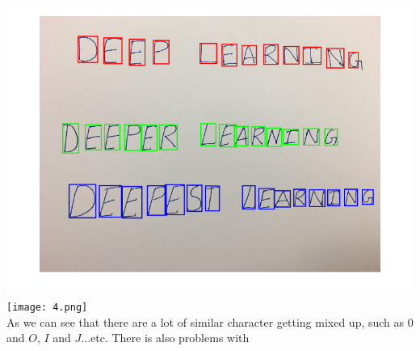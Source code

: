 \documentclass[12pt,letterpaper,boxed]{hmcpset}
\begin{document}
\begin{solution}
\includegraphics[width=\textwidth]{4_3_1.png}\\
\texttt{[image: 4.png]}\\
As we can see that there are a lot of similar character getting mixed up, such as $0$ and $O$, $I$ and $J$...etc. There
is also problems with 
\end{solution}
\newpage
\end{document}
